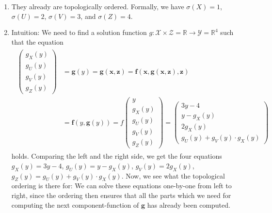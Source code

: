 \begin{enumerate}
\begin{gradedsolution}
\begin{enumerate}
\begin{equation}
				= \begin{pmatrix} 3y - 4 \\ y - x \\ 2x \\ u + v \cdot x\end{pmatrix}
				\label{eq:functional_equation}
			\end{equation}
			which we have already conveniently ordered.
			\item They already are topologically ordered. Formally, we have $\sigma(X) = 1$, $\sigma(U) = 2$, $\sigma(V) = 3$, and $\sigma(Z) = 4$.
			\item Intuition: We need to find a solution function $g: \boldsymbol{\mathcal{X}} \times \boldsymbol{\mathcal{Z}} = \mathbb{R} \to \boldsymbol{\mathcal{Y}} = \mathbb{R}^{4}$ such that the equation
			\begin{align}
				\begin{split}
					\begin{pmatrix} g_X(y) \\ g_U(y) \\ g_V(y) \\ g_Z(y)\end{pmatrix} & = \boldsymbol{g}(y)  = \boldsymbol{g}(\boldsymbol{x}, \boldsymbol{z}) = \boldsymbol{f}(\boldsymbol{x}, \boldsymbol{g}(\boldsymbol{x}, \boldsymbol{z}), \boldsymbol{z})
					\\ &	  = \boldsymbol{f}(y, \boldsymbol{g}(y))  =
					f \begin{pmatrix} y \\ g_X(y) \\ g_U(y) \\ g_V(y) \\ g_Z(y)\end{pmatrix} = \begin{pmatrix} 3y - 4 \\ y - g_X(y) \\ 2g_X(y) \\ g_U(y) + g_V(y) \cdot g_X(y)\end{pmatrix}
				\end{split}
				\label{eq:eq_constraint}
			\end{align}
			holds.
			Comparing the left and the right side, we get the four equations $g_X(y) = 3y - 4$, $g_U(y) = y - g_X(y)$, $g_V(y) = 2g_X(y)$, $g_Z(y) = g_U(y) + g_V(y) \cdot g_X(y)$.
			Now, we see what the topological ordering is there for: We can solve these equations one-by-one from left to right, since the ordering then ensures that all the parts which we need for computing the next component-function of $\boldsymbol{g}$ has already been computed.

\end{enumerate}
\end{gradedsolution}
\end{enumerate}
